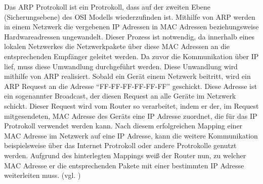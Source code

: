Das \ac{ARP} Protrokoll ist ein Protrokoll, dass auf der zweiten Ebene (Sicherungsebene) des OSI Modells wiederzufinden ist. Mithilfe von \ac{ARP} werden in einem Netzwerk die vergebenen \ac{IP} Adressen in MAC Adressen beziehungsweise Hardwareadressen ungewandelt. Dieser Prozess ist notwendig, da innerhalb eines lokalen Netzwerkes die Netzwerkpakete über diese MAC Adressen an die entsprechenden Empfänger geleitet werden. Da zuvor die Kommunikation über \ac{IP} lief, muss diese Umwandlung durchgeführt werden. 
Diese Unwandlung wird mithilfe von \ac{ARP} realisiert. Sobald ein Gerät einem Netzwerk beitritt, wird ein \ac{ARP} Request an die Adresse ``FF-FF-FF-FF-FF-FF'' geschickt. Diese Adresse ist ein sogenannter Broadcast, der diesen Request an alle Geräte im Netzwerk schickt. Dieser Request wird vom Router so verarbeitet, indem er der, im Request mitgesendeten, MAC Adresse des Geräts eine \ac{IP} Adresse zuordnet, die für das IP Protrokoll verwendet werden kann. Nach diesem erfolgreichen Mapping einer \ac{MAC} Adresse im Netzwerk auf eine \ac{IP} Adresse, kann die weitere Kommunikation beispielsweise über das Internet Protrokoll oder andere Protrokolle genutzt werden. Aufgrund des hinterlegten Mappings weiß der Router nun, zu welcher \ac{MAC} Adresse er die entsprechenden Pakete mit einer bestimmten \ac{IP} Adresse weiterleiten muss. (vgl. \cite{.r}\cite{.s})